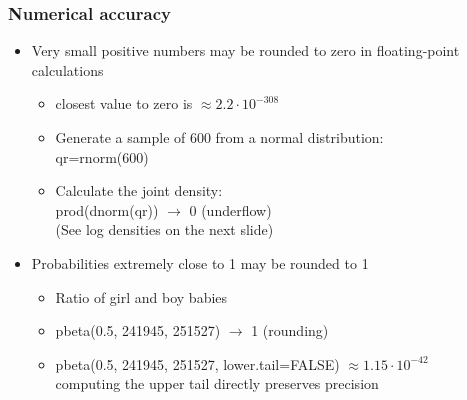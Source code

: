 \documentclass[10pt]{beamer}
\begin{document}
\begin{frame}

\frametitle{Numerical accuracy}

  \begin{itemize}
  \item Very small positive numbers may be rounded to zero in
    floating-point calculations
    \begin{itemize}
    \item closest value to zero is $\approx 2.2\cdot 10^{-308}$
      \item Generate a sample of 600 from a normal distribution:\\
        {\color{uured} qr=rnorm(600)}
      \item Calculate the joint density:\\
        {\color{uured} prod(dnorm(qr)) $\rightarrow$} {\color{red} 0 (underflow)}
      \\ (See log densities on the next slide)
    \end{itemize}
    \item<2-> Probabilities extremely close to 1 may be rounded to 1
      \begin{itemize}
      \item<2-> Ratio of girl and boy babies
      \item<2-> {\color{uured} pbeta(0.5, 241945, 251527) $\rightarrow$} {\color{red}  1 (rounding)}
      \item<3-> {\color{uured} pbeta(0.5, 241945, 251527, lower.tail=FALSE) $\approx 1.15\cdot 10^{-42}$}\\
        computing the upper tail directly preserves precision
      \end{itemize}
  \end{itemize}

\end{frame}
\end{document}
